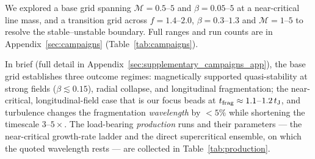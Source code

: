 \documentclass[usenatbib,twoside,twocolumn]{mnras}
\begin{document}
We explored a base grid spanning $\mathcal{M}=0.5$--$5$ and $\beta=0.05$--$5$ at a near-critical line mass, and a transition grid across $f=1.4$--$2.0$, $\beta=0.3$--$1.3$ and $\mathcal{M}=1$--$5$ to resolve the stable--unstable boundary. Full ranges and run counts are in Appendix~\ref{sec:campaigns} (Table~\ref{tab:campaigns}).

In brief (full detail in Appendix~\ref{sec:supplementary_campaigns_app}), the base grid establishes three outcome regimes: magnetically supported quasi-stability at strong fields ($\beta\lesssim0.15$), radial collapse, and longitudinal fragmentation; the near-critical, longitudinal-field case that is our focus beads at $t_{\rm frag}\approx1.1$--$1.2\,t_{\rm J}$, and turbulence changes the fragmentation \emph{wavelength} by $<5\%$ while shortening the timescale $3$--$5\times$. The load-bearing \emph{production} runs and their parameters --- the near-critical growth-rate ladder and the direct supercritical ensemble, on which the quoted wavelength rests --- are collected in Table~\ref{tab:production}.
\end{document}
